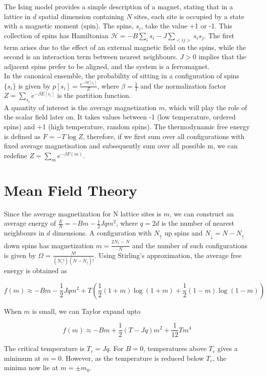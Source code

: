 The Ising model provides a simple description of a magnet, stating that in a lattice in $d$ spatial dimension containing $N$ sites, each site is occupied by a state with a magnetic moment (spin). The spins, $s_i$, take the value +1 or -1. This collection of spins has Hamiltonian $\mathcal{H}=-B\sum_i s_i- J\sum_{<ij>}s_is_j$. The first term arises due to the effect of an external magnetic field on the spins, while the second is an interaction term between nearest neighbours. $J>0$ implies that the adjacent spins prefer to be aligned, and the system is a ferromagnet.\\

\noindent In the canonical ensemble, the probability of sitting in a configuration of spins $\{s_i\}$ is given by $p[s_i]=\frac{e^{-\beta E[s_i]}}{Z}$, where $\beta=\frac{1}{T}$ and the normalization factor $Z=\sum_{s_i}e^{-\beta E[s_i]}$ is the partition function.\\ 

\noindent A quantity of interest is the average magnetization $m$, which will play the role of the scalar field later on. It takes values between -1 (low temperature, ordered spins) and +1 (high temperature, random spins). The thermodynamic free energy is defined as $F=-T\log Z$, therefore, if we first sum over all configurations with fixed average magnetisation and subsequently sum over all possible m, we can redefine $Z=\sum_me^{-\beta F(m)}$.

\section{Mean Field Theory}
Since the average magnetization for N lattice sites is $m$, we can construct an average energy of $\frac{E}{N}=-Bm-\frac{1}{2}Jqm^2$, where $q=2d$ is the number of nearest neighbours in $d$ dimensions. A configuration with $N_\uparrow$ up spins and $N_\downarrow=N-N_\uparrow$ down spins has magnetization $m=\frac{2N_\uparrow-N}{N}$ and the number of such configurations is given by $\Omega=\frac{N!}{(N_\uparrow!)(N-N_\uparrow)!}$. Using Stirling's approximation, the average free energy is obtained as

$$f(m)\approx -Bm-\frac{1}{2}Jqm^2+T\left(\frac{1}{2}(1+m)\log(1+m)+\frac{1}{2}(1-m)\log(1-m)\right)$$

\noindent When $m$ is small, we can Taylor expand upto

$$f(m)\approx -Bm+\frac{1}{2}(T-Jq)m^2+\frac{1}{12}Tm^4$$

\noindent The critical temperature is $T_c=Jq$. For $B=0$, temperatures above $T_c$ gives a minimum at $m=0$. However, as the temperature is reduced below $T_c$, the minima now lie at $m=\pm m_0$.

